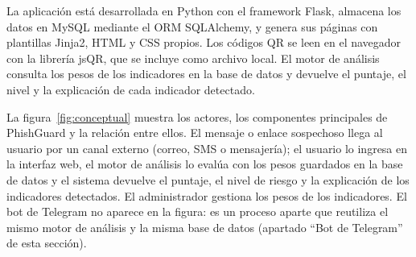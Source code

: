 \documentclass[journal,onecolumn,12pt,draftclsnofoot]{IEEEtran}
\begin{document}
La aplicación está desarrollada en Python con el framework Flask, almacena los datos en MySQL mediante el ORM SQLAlchemy, y genera sus páginas con plantillas Jinja2, HTML y CSS propios. Los códigos QR se leen en el navegador con la librería jsQR, que se incluye como archivo local. El motor de análisis consulta los pesos de los indicadores en la base de datos y devuelve el puntaje, el nivel y la explicación de cada indicador detectado.

La figura~\ref{fig:conceptual} muestra los actores, los componentes principales de PhishGuard y la relación entre ellos. El mensaje o enlace sospechoso llega al usuario por un canal externo (correo, SMS o mensajería); el usuario lo ingresa en la interfaz web, el motor de análisis lo evalúa con los pesos guardados en la base de datos y el sistema devuelve el puntaje, el nivel de riesgo y la explicación de los indicadores detectados. El administrador gestiona los pesos de los indicadores. El bot de Telegram no aparece en la figura: es un proceso aparte que reutiliza el mismo motor de análisis y la misma base de datos (apartado ``Bot de Telegram'' de esta sección).
\end{document}
